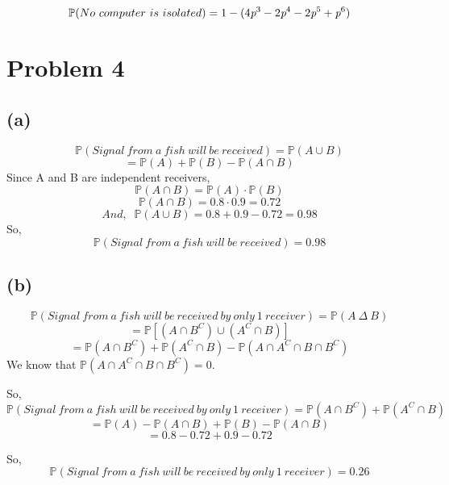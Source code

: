 \documentclass{article}
\begin{document}
			$$\mathbb{P}(No\ computer\ is\ isolated) = 1 - (4\emph{p}^3-2\emph{p}^4-2\emph{p}^5+\emph{p}^6) $$ 
			
	\section*{Problem 4}
		\subsection*{(a)}
			$$ \mathbb{P}(Signal\ from\ a\ fish\ will\ be\ received) = \mathbb{P}(A \cup B) $$
			$$ = \mathbb{P}(A)+\mathbb{P}(B)-\mathbb{P}(A \cap B) $$
			Since A and B are independent receivers, 
			$$ \mathbb{P}(A \cap B) = \mathbb{P}(A) \cdot \mathbb{P}(B) $$
			$$ \mathbb{P}(A \cap B) = 0.8 \cdot 0.9 = 0.72 $$
			$$And, \; \;  \mathbb{P}(A \cup B) = 0.8 + 0.9 - 0.72 = 0.98 $$
			So,
			$$ \mathbb{P}(Signal\ from\ a\ fish\ will\ be\ received) = 0.98 $$
		\subsection*{(b)}
			$$ \mathbb{P}(Signal\ from\ a\ fish\ will\ be\ received\ by\ only\ 1\ receiver) = \mathbb{P}(A\ \Delta \ B) $$ 
			$$ = \mathbb{P} [ (A \cap B^C) \cup (A^C \cap B) ] $$
			$$ = \mathbb{P}(A \cap B^C) + \mathbb{P}(A^C \cap B) - \mathbb{P}(A \cap A^C \cap B \cap B^C) $$
			We know that $\mathbb{P}(A \cap A^C \cap B \cap B^C)=0$.
			
			
			So,
			$$ \mathbb{P}(Signal\ from\ a\ fish\ will\ be\ received\ by\ only\ 1\ receiver) = \mathbb{P}(A \cap B^C) + \mathbb{P}(A^C \cap B) $$
			$$ = \mathbb{P}(A)-\mathbb{P}(A \cap B) + \mathbb{P}(B) - \mathbb{P}(A \cap B) $$
			$$ = 0.8 - 0.72 + 0.9 - 0.72 $$
			
			So,
			$$ \mathbb{P}(Signal\ from\ a\ fish\ will\ be\ received\ by\ only\ 1\ receiver) = 0.26 $$
		
\end{document}
